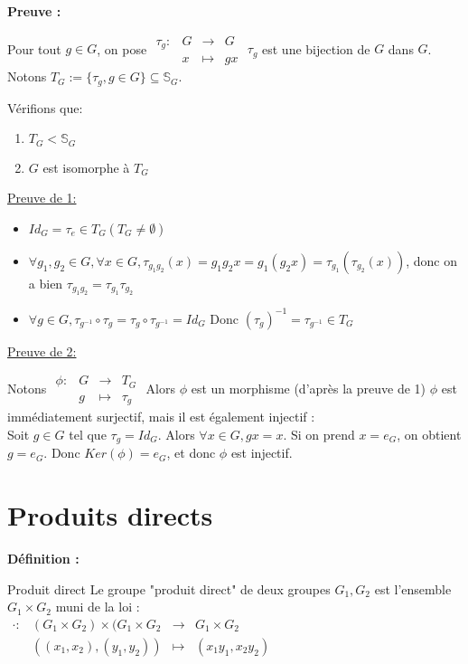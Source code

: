 \documentclass{report}
\newenvironment{definition}[1][]{
    \begin{tcolorbox}[colframe= white]
    \textbf{Définition :} 
    #1 \par
    }
    {\end{tcolorbox}}
\newenvironment{preuve}{\begin{tcolorbox}[colframe= white]
    \textbf{Preuve :}
\par }
    {\end{tcolorbox}}
\newcommand{\fonction}[5]{
    \begin{array}{l|rcl}
    #1: & #2 & \longrightarrow & #3 \\
        & #4 & \longmapsto & #5 
    \end{array}
}
\begin{document}
\begin{preuve}
    Pour tout $g\in G$, on pose $\fonction{\tau_g}{G}{G}{x}{gx}$ $\tau_g$ est une bijection de $G$ dans $G$. Notons $T_G := \{\tau_g,g\in G\} \subseteq \mathbb{S}_G$. \par
    \noindent Vérifions que:  \par
    
    \begin{enumerate}
    \item $T_G < \mathbb{S}_G$
    \item $G$ est isomorphe à $T_G$
    \end{enumerate}

\noindent\underline{Preuve de 1:}
\begin{itemize}[label = $\bullet$]
\item $Id_G = \tau_e \in T_G (T_G \neq \emptyset)$
\item  $\forall g_1,g_2 \in G,\forall x \in G, \tau_{g_1 g_2}(x) = g_1 g_2 x = g_1(g_2 x) = \tau_{g_1}(\tau_{g_2}(x))$, donc on a bien $\tau_{g_1 g_2} = \tau_{g_1} \tau_{g_2}$
\item $\forall g \in G, \tau_{g^{-1}} \circ \tau_g = \tau_g \circ \tau_{g^{-1}} = Id_G$ Donc $(\tau_g)^{-1} = \tau_{g^{-1}} \in T_G$
\end{itemize}

\noindent\underline{Preuve de 2:}

    Notons $\fonction{\phi}{G}{T_G}{g}{\tau_g}$
    Alors $\phi$ est un morphisme (d'après la preuve de 1) $\phi$ est immédiatement surjectif, mais il est également injectif :\\
Soit $g\in G$ tel que $\tau_g = Id_G$. Alors $\forall x \in G, gx =  x$. Si on prend $x =  e_G$, on obtient $g = e_G$. Donc $Ker(\phi) = {e_G}$, et donc $\phi$ est injectif.
\end{preuve}

\section{Produits directs}

\begin{definition}{Produit direct}
    Le groupe "produit direct" de deux groupes $G_1, G_2$ est l'ensemble $G_1 \times G_2$ muni de la loi :\\
    $\fonction{\cdot}{(G_1 \times G_2)\times(G_1 \times G_2}{G_1 \times G_2}{((x_1 ,x_2),(y_1 ,y_2))}{(x_1 y_1 ,x_2 y_2)}$
\end{definition}
\end{document}
